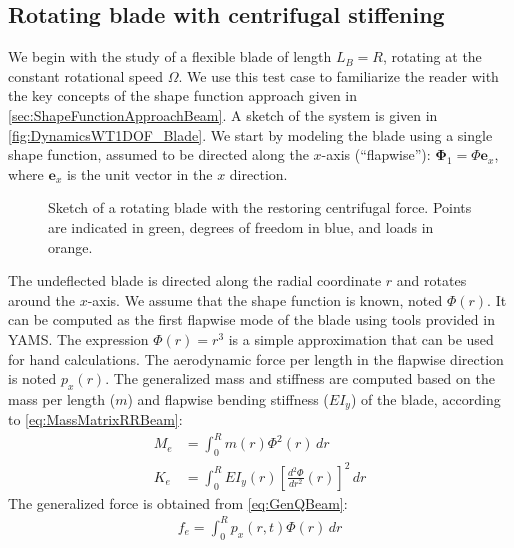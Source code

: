 \documentclass[wes, manuscript]{copernicus}
\renewcommand{\v}[1]{\boldsymbol{#1}}
\begin{document}
\subsection{Rotating blade with centrifugal stiffening}
\label{sec:RotatingBlade}
We begin with the study of a flexible blade of length $L_B=R$, rotating at the constant rotational speed $\Omega$.
We use this test case to familiarize the reader with the key concepts of the shape function approach given in \autoref{sec:ShapeFunctionApproachBeam}. 
A sketch of the system is given in \autoref{fig:DynamicsWT1DOF_Blade}.
We start by modeling the blade using a single shape function, assumed to be directed along the $x$-axis (``flapwise''): $\v{\Phi}_1=\Phi \v{e}_x$, where $\v{e}_x$ is the unit vector in the $x$ direction.
\begin{figure}[!htb]
 \centering%
 \def\svgwidth{0.5\columnwidth}%
 \caption{Sketch of a rotating blade with the restoring centrifugal force. Points are indicated in green, degrees of freedom in blue, and loads in orange.}\label{fig:DynamicsWT1DOF_Blade}%
 \end{figure}%
The undeflected blade is directed along the radial coordinate $r$ and rotates around the $ x$-axis.
We assume that the shape function is known, noted $\Phi(r)$. 
It can be computed as the first flapwise mode of the blade using tools provided in YAMS.
The expression $\Phi(r)=r^3$ is a simple approximation that can be used for hand calculations. 
The aerodynamic force per length in the flapwise direction is noted $p_x(r)$.
The generalized mass and stiffness are computed based on the mass per length ($m$) and flapwise bending stiffness ($EI_y$) of the blade, according to \autoref{eq:MassMatrixRRBeam}:
\begin{align}
  M_{e}&=\int_0^{R} m(r) \Phi^2(r)\, dr
  \label{eq:MeBlade}
      \\
  K_{e}&=\int_0^{R} EI_y(r) \left[\frac{d^2\Phi}{dr^2}(r)\right]^2\, dr
  \label{eq:KeBlade}
\end{align}
The generalized force is obtained from \autoref{eq:GenQBeam}:
\begin{align}
  f_{e}=\int_0^{R} p_x(r,t)\Phi(r)\, dr 
\end{align}
\end{document}
